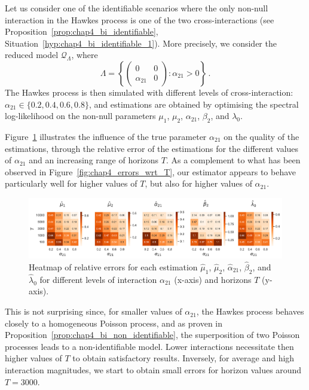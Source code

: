        Let us consider one of the identifiable scenarios where the only non-null interaction in the Hawkes process is one of the two cross-interactions (see Proposition~\ref{prop:chap4_bi_identifiable}, Situation~\ref{hyp:chap4_bi_identifiable_1}).
        More precisely, we consider the reduced model $\mathcal{Q}_{\Lambda}$,
        where
        \[
          \Lambda = \left\{ \begin{pmatrix} 0 & 0 \\ \alpha_{21} & 0 \end{pmatrix} : \alpha_{21} > 0 \right\} \,.
        \]
        The Hawkes process is then simulated with different levels of cross-interaction: $\alpha_{21} \in \{0.2, 0.4, 0.6, 0.8\}$,
        and estimations are obtained by optimising the spectral log-likelihood on the non-null parameters $\mu_1$, $\mu_2$, $\alpha_{21}$, $\beta_2$, and $\lambda_0$.
        
        Figure~\ref{fig:chap4_bi_phase_transition} illustrates the influence of the true parameter $\alpha_{21}$ on the quality of the estimations,
	      through the relative error of the estimations for the different values of $\alpha_{21}$ and 
	      an increasing range of horizons $T$.
	      As a complement to what has been observed in Figure~\ref{fig:chap4_errors_wrt_T},
	      our estimator appears to behave particularly well for higher values of $T$, but also for higher values of $\alpha_{21}$.


        \begin{figure}[!ht]
			\centering
			\includegraphics[width=\linewidth]{images/chapter4//phase_transition.pdf}
 		   	\caption{Heatmap of relative errors for each estimation $\hat\mu_1$, $\hat\mu_2$, $\hat\alpha_{21}$, $\hat\beta_2$, and $\hat\lambda_0$ for different levels of interaction $\alpha_{21}$ (x-axis) and horizons $T$ (y-axis).}
 		  \label{fig:chap4_bi_phase_transition}
		\end{figure}
        
        This is not surprising since, for smaller values of $\alpha_{21}$, the Hawkes process behaves closely to a homogeneous Poisson process, and as proven in Proposition~\ref{prop:chap4_bi_non_identifiable}, the superposition of two Poisson processes leads to a non-identifiable model. Lower interactions necessitate then higher values of $T$ to obtain satisfactory results. Inversely, for average and high interaction magnitudes, we start to obtain small errors for horizon values around $T=3000$. 
		
